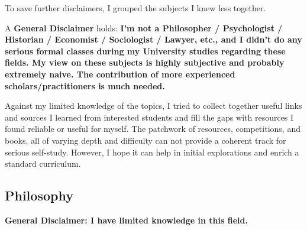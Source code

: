 \documentclass{article}
\begin{document}
To save further disclaimers, I grouped the subjects I knew less together.

A \textbf{General Disclaimer} holds:
\textbf{I'm not a Philosopher / Psychologist / Historian / Economist / Sociologist / Lawyer, etc., and I didn't do any serious formal classes during my University studies regarding these fields. My view on these subjects is highly subjective and probably extremely naive. The contribution of more experienced scholars/practitioners is much needed.}

Against my limited knowledge of the topics, I tried to collect together useful links and sources I learned from interested students and fill the gaps with resources I found reliable or useful for myself.
The patchwork of resources, competitions, and books, all of varying depth and difficulty can not provide a coherent track for serious self-study. However, I hope it can help in initial explorations and enrich a standard curriculum.

\subsection{Philosophy}
\textbf{General Disclaimer: I have limited knowledge in this field.}
\end{document}
